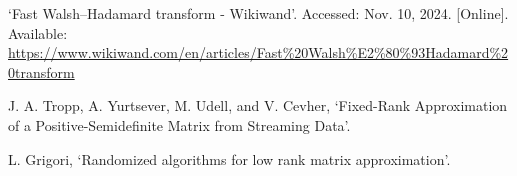 \documentclass[a4paper, 12pt,oneside]{article}
\begin{document}
	\noindent
	[2] ‘Fast Walsh–Hadamard transform - Wikiwand’. Accessed: Nov. 10, 2024. [Online]. Available: \url{https://www.wikiwand.com/en/articles/Fast%20Walsh%E2%80%93Hadamard%20transform}
	
	\noindent
	[3] J. A. Tropp, A. Yurtsever, M. Udell, and V. Cevher, ‘Fixed-Rank Approximation of a Positive-Semidefinite Matrix from Streaming Data’.
	
	\noindent
	[4] L. Grigori, ‘Randomized algorithms for low rank matrix approximation’.
\end{document}
